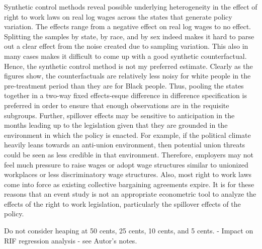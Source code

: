 \documentclass[11pt]{article}
\begin{document}
Synthetic control methods reveal possible underlying heterogeneity in the effect of right to work laws on real log wages across the states that generate policy variation. The effects range from a negative effect on real log wages to no effect. Splitting the samples by state, by race, and by sex indeed makes it hard to parse out a clear effect from the noise created due to sampling variation. This also in many cases makes it difficult to come up with a good synthetic counterfactual. Hence, the synthetic control method is not my preferred estimate. Clearly as the figures show, the counterfactuals are relatively less noisy for white people in the pre-treatment period than they are for Black people. Thus, pooling the states together in a two-way fixed effects-esque difference in difference specification is preferred in order to ensure that enough observations are in the requisite subgroups. Further, spillover effects may be sensitive to anticipation in the months leading up to the legislation given that they are grounded in the environment in which the policy is enacted. For example, if the political climate heavily leans towards an anti-union environment, then potential union threats could be seen as less credible in that environment. Therefore, employers may not feel much pressure to raise wages or adopt wage structures similar to unionized workplaces or less discriminatory wage structures. Also, most right to work laws come into force as existing collective bargaining agreements expire. It is for these reasons that an event study is not an appropriate econometric tool to analyze the effects of the right to work legislation, particularly the spillover effects of the policy. 



Do not consider heaping at 50 cents, 25 cents, 10 cents, and 5 cents. - Impact on RIF regression analysis - see Autor's notes.
\end{document}
